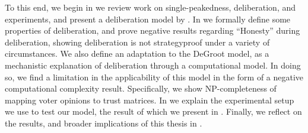 To this end, we begin in  we review work on
single-peakedness, deliberation, and experiments, and present a
deliberation model by \citet{radDeliberationSinglePeakednessCoherent2021}. In
 we formally define some properties of deliberation, and prove
negative results regarding ``Honesty'' during deliberation, showing
deliberation is not strategyproof under a variety of circumstances. We also
define an adaptation to the DeGroot model, as a mechanistic explanation of
deliberation through a computational model. In doing so, we find a limitation
in the applicability of  this model in the form of a negative computational
complexity result. Specifically, we show NP-completeness of mapping voter opinions to trust
matrices. In  we explain the experimental setup we use to test
our model, the result of which we present in .
Finally, we reflect on the results, and broader implications of this thesis in .
